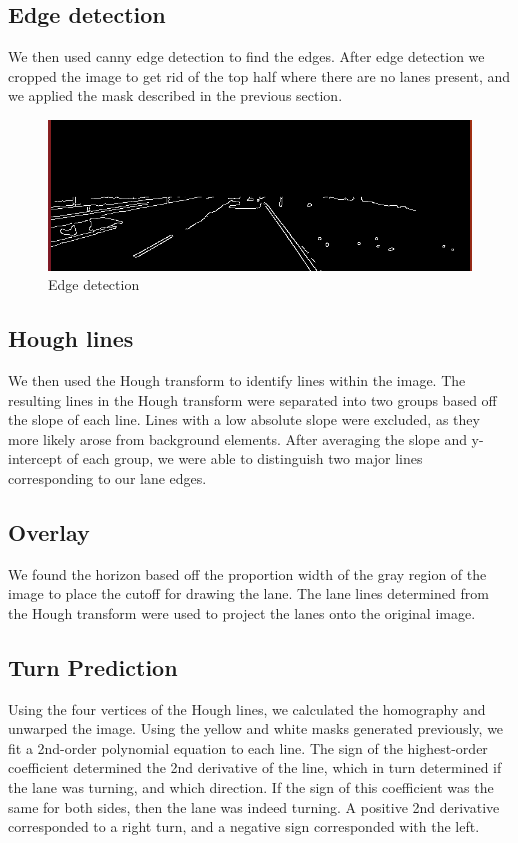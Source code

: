 \documentclass[12pt]{report}
\begin{document}
{\subsection*{Edge detection}
We then used canny edge detection to find the edges. After edge detection we cropped the image to get rid of the top half where there are no lanes present, and we applied the mask described in the previous section.
\begin{figure}[h!]
    \centering
    \includegraphics[scale=0.4]{canny__01.png}
    \caption{Edge detection}
    \label{fig:my_label2}
\end{figure}
\subsection*{Hough lines}
We then used the Hough transform to identify lines within the image.  The resulting lines in the Hough transform were separated into two groups based off the slope of each line.  Lines with a low absolute slope were excluded, as they more likely arose from background elements.  After averaging the slope and y-intercept of each group, we were able to distinguish two major lines corresponding to our lane edges.

\subsection*{Overlay}

We found the horizon based off the proportion width of the gray region of the image to place the cutoff for drawing the lane.  The lane lines determined from the Hough transform were used to project the lanes onto the original image.

\subsection*{Turn Prediction }
Using the four vertices of the Hough lines, we calculated the homography and unwarped the image.  Using the yellow and white masks generated previously, we fit a 2nd-order polynomial equation to each line.  The sign of the highest-order coefficient determined the 2nd derivative of the line, which in turn determined if the lane was turning, and which direction.  If the sign of this coefficient was the same for both sides, then the lane was indeed turning.  A positive 2nd derivative corresponded to a right turn, and a negative sign corresponded with the left.

}
\end{document}
